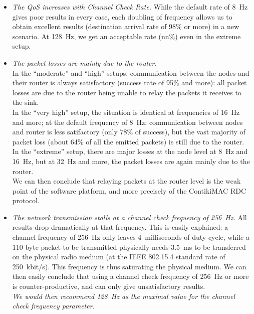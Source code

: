 \documentclass[a4paper,twoside]{article}
\begin{document}
\begin{itemize}

\item \emph{The QoS increases with Channel Check Rate.} While the default
rate of 8~Hz gives poor results in every case, each doubling of frequency
allows us to obtain excellent results (destination arrival rate of 98\%
or more) in a new scenario. At 128~Hz, we get an acceptable rate (nn\%)
even in the extreme setup.

\item \emph{The packet losses are mainly due to the router.}\\
In the ``moderate'' and ``high'' setups, communication between the nodes
and their router is always satisfactory (success rate of 95\% and more):
all packet losses are due to the router being unable to relay the packets
it receives to the sink.\\
In the ``very high'' setup, the situation is identical at frequencies
of 16~Hz and more; at the default frequency of 8~Hz: communication between
nodes and router is less satifactory (only 78\% of success), but the vast
majority of packet loss (about 64\% of all the emitted packets) is still
due to the router.\\
In the ``extreme'' setup, there are major losses at the node level at 8~Hz
and 16~Hz, but at 32~Hz and more, the packet losses are again mainly due
to the router.\\
We can then conclude that relaying packets at the router level is the
weak point of the software platform, and more precisely of the ContikiMAC
RDC protocol.

\item \emph{The network transmission stalls at a channel check frequency
of 256~Hz.} All results drop dramatically at that frequency.
This is easily explained: a channel frequency of 256~Hz only leaves
4~milliseconds of duty cycle, while a 110 byte packet to be transmitted
physically needs 3.5~ms to be transferred on the physical radio medium
(at the IEEE 802.15.4 standard rate of 250~kbit/s). This frequency is
thus saturating the physical medium. We can then easily conclude that
using a channel check frequency of 256~Hz or more is counter-productive,
and can only give unsatisfactory results.\\
\emph{We would then recommend 128~Hz as the maximal value for the channel
check frequency parameter.}

\end{itemize}
\end{document}

